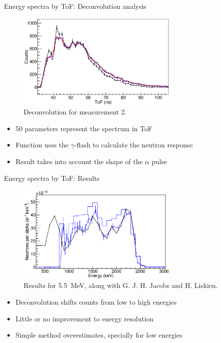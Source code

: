 \documentclass[11pt]{beamer}
\begin{document}
\begin{frame}{Energy spectra by ToF: Deconvolution analysis}
	\begin{figure}[H]
		\centering
		\includegraphics[width=0.70\textwidth]{pulsed_deconvolution_delta.eps}
		\caption{Deconvolution for measurement 2.}
		\label{}
	\end{figure}
	\begin{itemize}
		\item 50 parameters represent the spectrum in ToF
		\item Function uses the $\gamma$-flash to calculate the neutron response
		\item Result takes into account the shape of the $\alpha$ pulse
	\end{itemize}
\end{frame}

\begin{frame}{Energy spectra by ToF: Results}
	\begin{figure}[H]
		\centering
		\includegraphics[width=0.70\textwidth]{pulsed_5mev.eps}
		\caption{Results for \qty{5.5}{\MeV}, along with G. J. H. Jacobs and H. Liskien\cite{jacobs}.}
		\label{}
	\end{figure}
	\begin{itemize}
		\item Deconvolution shifts counts from low to high energies
		\item Little or no improvement to energy resolution
		\item Simple method overestimates, specially for low energies
	\end{itemize}
\end{frame}
\end{document}
